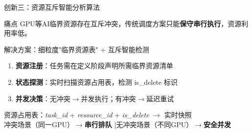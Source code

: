 \documentclass[aspectratio=169,UTF8,xcolor=table]{ctexbeamer}
\begin{document}
\begin{frame}{创新三：资源互斥智能分析算法}
  \begin{alertblock}{痛点}
    GPU等AI临界资源存在互斥冲突，传统调度方案只能\textbf{保守串行执行}，资源利用率低。
  \end{alertblock}

  \begin{exampleblock}{解决方案：细粒度"临界资源表" + 互斥智能检测}
    \begin{enumerate}
      \item \textbf{资源注册}：任务需在定义阶段声明所需临界资源清单
      \item \textbf{状态探测}：实时扫描资源占用表，检测 is\_delete 标识
      \item \textbf{并发决策}：无冲突$\rightarrow$并发执行；有冲突$\rightarrow$延迟重试
    \end{enumerate}
    \begin{center}
      \small
      资源占用表：\textit{task\_id} + \textit{resource\_id} + \textit{is\_delete} $\longrightarrow$ 实时快照\\[2pt]
      冲突场景（同一GPU）$\rightarrow$\textbf{串行排队} \quad|\quad 无冲突场景（不同GPU）$\rightarrow$\textbf{安全并发}
    \end{center}
  \end{exampleblock}
\end{frame}
\end{document}
